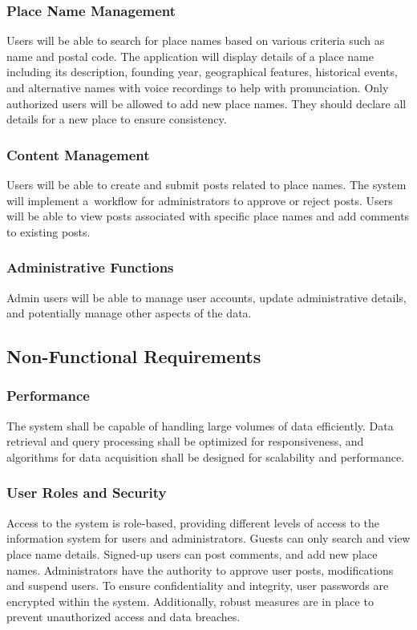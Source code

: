 \subsubsection{Place Name Management}
Users will be able to search for place names based on various criteria such as name and postal code. The application will display details of a place name including its description, founding year, geographical features, historical events, and alternative names with voice recordings to help with pronunciation. Only authorized users will be allowed to add new place names. They should declare all details for a new place to ensure consistency.

\subsubsection{Content Management}
Users will be able to create and submit posts related to place names. The system will implement a~workflow for administrators to approve or reject posts. Users will be able to view posts associated with specific place names and add comments to existing posts.

\subsubsection{Administrative Functions}
Admin users will be able to manage user accounts, update administrative details, and potentially manage other aspects of the data.

\subsection{Non-Functional Requirements}

\subsubsection{Performance}
The system shall be capable of handling large volumes of data efficiently. Data retrieval and query processing shall be optimized for responsiveness, and algorithms for data acquisition shall be designed for scalability and performance.

\subsubsection{User Roles and Security}
Access to the system is role-based, providing different levels of access to the information system for users and administrators. Guests can only search and view place name details. Signed-up users can post comments, and add new place names. Administrators have the authority to approve user posts, modifications and suspend users. To ensure confidentiality and integrity, user passwords are encrypted within the system. Additionally, robust measures are in place to prevent unauthorized access and data breaches.


